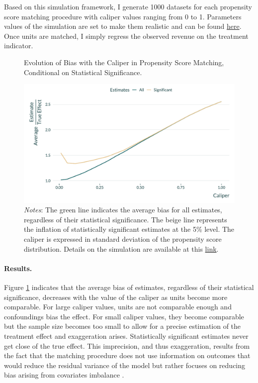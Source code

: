 \documentclass[usletter, 12pt]{article}
\begin{document}
        		Based on this simulation framework, I generate 1000 datasets for each propensity score matching procedure with caliper values ranging from 0 to 1. Parameters values of the simulation are set to make them realistic and can be found \href{https://vincentbagilet.github.io/causal_inflation/Matching.html}{here}. Once units are matched, I simply regress the observed revenue on the treatment indicator.
        
         \begin{figure}[!h] 
			    \caption{Evolution of Bias with the Caliper in Propensity Score Matching, Conditional on Statistical Significance.}
				\label{graph_matching}
			 \centering\includegraphics[width=0.9\linewidth]{images/main_graph_matching_paper.pdf}
			 \caption*{\footnotesize \textit{Notes}: The green line indicates the average bias for all estimates, regardless of their statistical significance. The beige line represents the inflation of statistically significant estimates at the 5\% level. The caliper is expressed in standard deviation of the propensity score distribution. Details on the simulation are available at this \href{https://vincentbagilet.github.io/causal_exaggeration/Matching.html}{link}.}
		\end{figure} 
        
        \paragraph{Results.} Figure \ref{graph_matching} indicates that the average bias of estimates, regardless of their statistical significance, decreases with the value of the caliper as units become more comparable. For large caliper values, units are not comparable enough and confoundings bias the effect. For small caliper values, they become comparable but the sample size becomes too small to allow for a precise estimation of the treatment effect and exaggeration arises. Statistically significant estimates never get close of the true effect. This imprecision, and thus exaggeration, results from the fact that the matching procedure does not use information on outcomes that would reduce the residual variance of the model but rather focuses on reducing bias arising from covariates imbalance \citep{rubin_using_2001}. 
        
\end{document}
